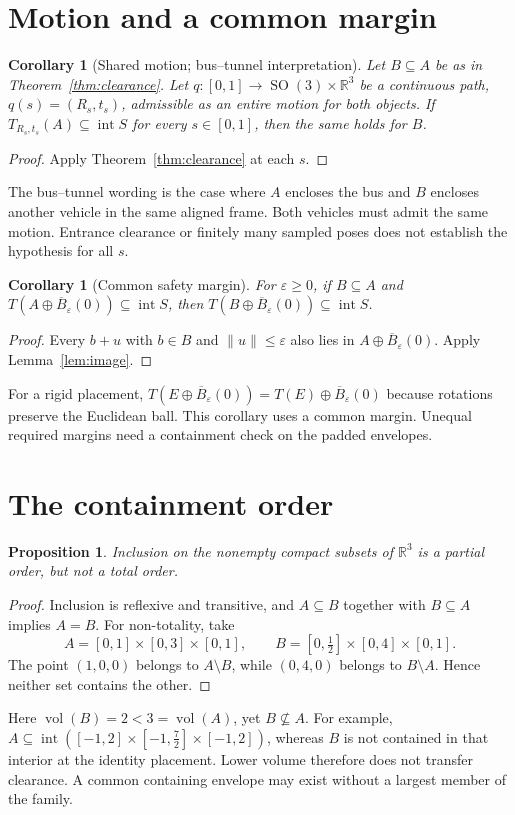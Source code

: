 \documentclass[11pt,a4paper]{article}
\newtheorem{corollary}[theorem]{Corollary}
\newtheorem{proposition}[theorem]{Proposition}
\theoremstyle{definition}
\theoremstyle{remark}
\newcommand{\R}{\mathbb{R}}
\newcommand{\interior}{\operatorname{int}}
\newcommand{\SO}{\operatorname{SO}}
\begin{document}
\section{Motion and a common margin}
\begin{corollary}[Shared motion; bus--tunnel interpretation]\label{cor:motion}
Let $B\subseteq A$ be as in Theorem~\ref{thm:clearance}. Let $q:[0,1]\to\SO(3)\times\R^3$ be a continuous path, $q(s)=(R_s,t_s)$, admissible as an entire motion for both objects. If $T_{R_s,t_s}(A)\subseteq\interior S$ for every $s\in[0,1]$, then the same holds for $B$.
\end{corollary}
\begin{proof}
Apply Theorem~\ref{thm:clearance} at each $s$.
\end{proof}
The bus--tunnel wording is the case where $A$ encloses the bus and $B$ encloses another vehicle in the same aligned frame. Both vehicles must admit the same motion. Entrance clearance or finitely many sampled poses does not establish the hypothesis for all $s$.

\begin{corollary}[Common safety margin]\label{cor:margin}
For $\varepsilon\geq0$, if $B\subseteq A$ and $T(A\oplus\overline B_\varepsilon(0))\subseteq\interior S$, then $T(B\oplus\overline B_\varepsilon(0))\subseteq\interior S$.
\end{corollary}
\begin{proof}
Every $b+u$ with $b\in B$ and $\|u\|\leq\varepsilon$ also lies in $A\oplus\overline B_\varepsilon(0)$. Apply Lemma~\ref{lem:image}.
\end{proof}
For a rigid placement, $T(E\oplus\overline B_\varepsilon(0))=T(E)\oplus\overline B_\varepsilon(0)$ because rotations preserve the Euclidean ball. This corollary uses a common margin. Unequal required margins need a containment check on the padded envelopes.

\section{The containment order}
\begin{proposition}\label{prop:order}
Inclusion on the nonempty compact subsets of $\R^3$ is a partial order, but not a total order.
\end{proposition}
\begin{proof}
Inclusion is reflexive and transitive, and $A\subseteq B$ together with $B\subseteq A$ implies $A=B$. For non-totality, take
\[
A=[0,1]\times[0,3]\times[0,1],\qquad
B=[0,\tfrac12]\times[0,4]\times[0,1].
\]
The point $(1,0,0)$ belongs to $A\setminus B$, while $(0,4,0)$ belongs to $B\setminus A$. Hence neither set contains the other.
\end{proof}
Here $\operatorname{vol}(B)=2<3=\operatorname{vol}(A)$, yet $B\nsubseteq A$. For example, $A\subseteq\interior([-1,2]\times[-1,\tfrac72]\times[-1,2])$, whereas $B$ is not contained in that interior at the identity placement. Lower volume therefore does not transfer clearance. A common containing envelope may exist without a largest member of the family.
\end{document}
